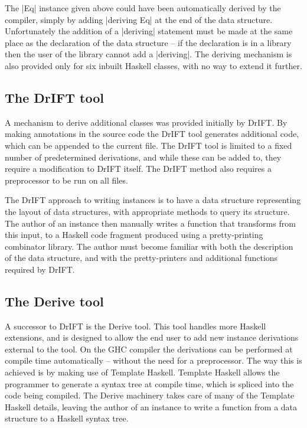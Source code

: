 \documentclass{llncs}
\begin{document}
The |Eq| instance given above could have been automatically derived by the compiler, simply by adding |deriving Eq| at the end of the data structure. Unfortunately the addition of a |deriving| statement must be made at the same place as the declaration of the data structure -- if the declaration is in a library then the user of the library cannot add a |deriving|. The deriving mechanism is also provided only for six inbuilt Haskell classes, with no way to extend it further.

\subsection{The DrIFT tool}

A mechanism to derive additional classes was provided initially by DrIFT. By making annotations in the source code the DrIFT tool generates additional code, which can be appended to the current file. The DrIFT tool is limited to a fixed number of predetermined derivations, and while these can be added to, they require a modification to DrIFT itself. The DrIFT method also requires a preprocessor to be run on all files.

The DrIFT approach to writing instances is to have a data structure representing the layout of data structures, with appropriate methods to query its structure. The author of an instance then manually writes a function that transforms from this input, to a Haskell code fragment produced using a pretty-printing combinator library. The author must become familiar with both the description of the data structure, and with the pretty-printers and additional functions required by DrIFT.

\subsection{The Derive tool}

A successor to DrIFT is the Derive tool. This tool handles more Haskell extensions, and is designed to allow the end user to add new instance derivations external to the tool. On the GHC compiler the derivations can be performed at compile time automatically -- without the need for a preprocessor. The way this is achieved is by making use of Template Haskell. Template Haskell allows the programmer to generate a syntax tree at compile time, which is spliced into the code being compiled. The Derive machinery takes care of many of the Template Haskell details, leaving the author of an instance to write a function from a data structure to a Haskell syntax tree.
\end{document}
